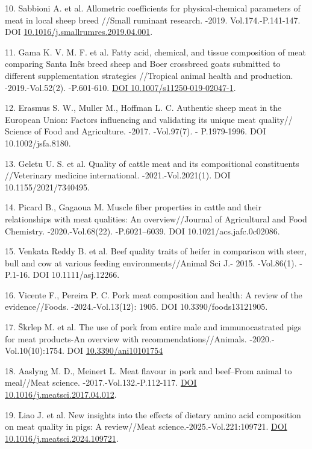 \begin{refs}
10. Sabbioni A. et al. Allometric coefficients for physical-chemical
parameters of meat in local sheep breed //Small ruminant research.
-2019. Vol.174.-P.141-147. DOI
\href{https://doi.org/10.1016/j.smallrumres.2019.04.001}{10.1016/j.smallrumres.2019.04.001}.

11. Gama K. V. M. F. et al. Fatty acid, chemical, and tissue composition
of meat comparing Santa Inês breed sheep and Boer crossbreed goats
submitted to different supplementation strategies //Tropical animal
health and production. -2019.-Vol.52(2). -P.601-610.
\href{https://doi.org/10.1007/s11250-019-02047-1}{DOI
10.1007/s11250-019-02047-1}.

12. Erasmus S. W., Muller M., Hoffman L. C. Authentic sheep meat in the
European Union: Factors influencing and validating its unique meat
quality// Science of Food and Agriculture. -2017. -Vol.97(7). -
P.1979-1996. DOI 10.1002/jsfa.8180.

13. Geletu U. S. et al. Quality of cattle meat and its compositional
constituents //Veterinary medicine international. -2021.-Vol.2021(1).
DOI 10.1155/2021/7340495.

14. Picard B., Gagaoua M. Muscle fiber properties in cattle and their
relationships with meat qualities: An overview//Journal of Agricultural
and Food Chemistry. -2020.-Vol.68(22). -P.6021--6039. DOI
10.1021/acs.jafc.0c02086.

15. Venkata Reddy B. et al. Beef quality traits of heifer in comparison
with steer, bull and cow at various feeding environments//Animal Sci J.-
2015. -Vol.86(1). -P.1-16. DOI 10.1111/asj.12266.

16. Vicente F., Pereira P. C. Pork meat composition and health: A review
of the evidence//Foods. -2024.-Vol.13(12): 1905. DOI
10.3390/foods13121905.

17. Škrlep M. et al. The use of pork from entire male and
immunocastrated pigs for meat products-An overview with
recommendations//Animals. -2020.-Vol.10(10):1754. DOI
\href{https://doi.org/10.3390/ani10101754}{10.3390/ani10101754}

18. Aaslyng M. D., Meinert L. Meat flavour in pork and beef--From animal
to meal//Meat science. -2017.-Vol.132.-P.112-117.
\href{https://doi.org/10.1016/j.meatsci.2017.04.012}{DOI
10.1016/j.meatsci.2017.04.012}.

19. Liao J. et al. New insights into the effects of dietary amino acid
composition on meat quality in pigs: A review//Meat
science.-2025.-Vol.221:109721.
\href{https://doi.org/10.1016/j.meatsci.2024.109721}{DOI
10.1016/j.meatsci.2024.109721}.


\end{refs}
